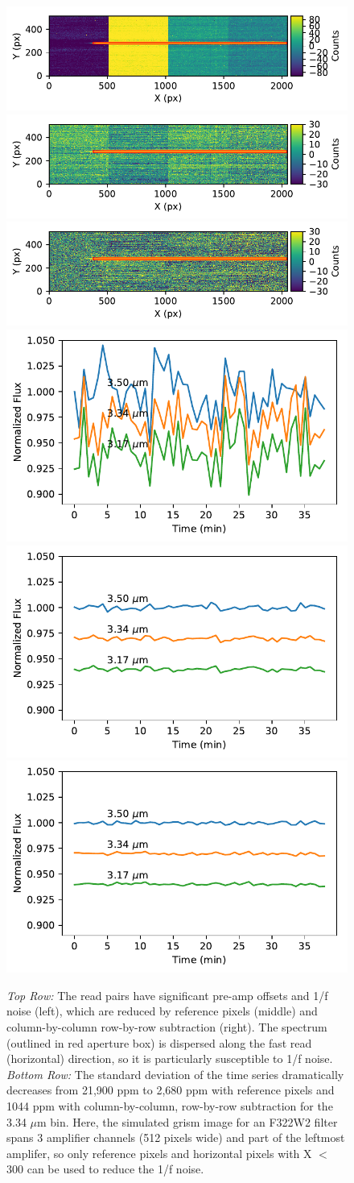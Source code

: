 \documentclass[]{aastex62}
\begin{document}
\begin{figure}[!hbtp]
\centering
\includegraphics[width=.32\columnwidth]{spec_aps_pairwiseSubNoRed_otisLongDarkSimGrism.pdf}
\includegraphics[width=.32\columnwidth]{spec_aps_pairwiseSubRed_covWeights_otisLongDarkSimGrism.pdf}
\includegraphics[width=.32\columnwidth]{spec_aps_pairwiseSub_backsub_otisLongDarkSimGrism.pdf}
\includegraphics[width=.32\columnwidth]{tser_pairwiseSub_noRed01.pdf}
\includegraphics[width=.32\columnwidth]{tser_pairwiseSubRed.pdf}
\includegraphics[width=.32\columnwidth]{tser_pairwiseSubRed_backsub.pdf}
\caption{ {\it Top Row:} The read pairs have significant pre-amp offsets and 1/f noise (left), which are reduced by reference pixels (middle) and column-by-column row-by-row subtraction (right).
The spectrum (outlined in red aperture box) is dispersed along the fast read (horizontal) direction, so it is particularly susceptible to 1/f noise.
{\it Bottom Row:} The standard deviation of the time series dramatically decreases from 21,900 ppm to 2,680 ppm with reference pixels and 1044 ppm with column-by-column, row-by-row subtraction for the 3.34 $\mu$m bin.
Here, the simulated grism image for an F322W2 filter spans 3 amplifier channels (512 pixels wide) and part of the leftmost amplifer, so only reference pixels and horizontal pixels with X $<$ 300 can be used to reduce the 1/f noise.
}\label{fig:longDarkGrism}
\end{figure}
\end{document}
